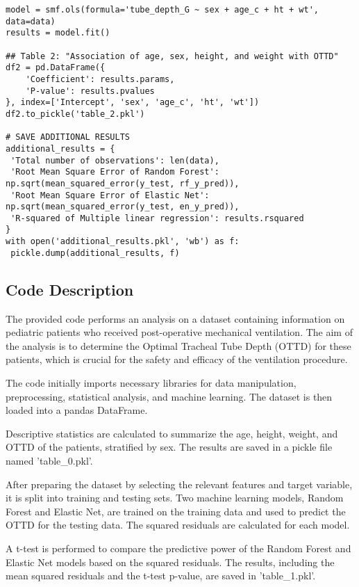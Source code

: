 \documentclass[11pt]{article}
\begin{document}
\begin{verbatim}
model = smf.ols(formula='tube_depth_G ~ sex + age_c + ht + wt', data=data)
results = model.fit()

## Table 2: "Association of age, sex, height, and weight with OTTD"
df2 = pd.DataFrame({
    'Coefficient': results.params,
    'P-value': results.pvalues
}, index=['Intercept', 'sex', 'age_c', 'ht', 'wt'])
df2.to_pickle('table_2.pkl')

# SAVE ADDITIONAL RESULTS
additional_results = {
 'Total number of observations': len(data),
 'Root Mean Square Error of Random Forest': np.sqrt(mean_squared_error(y_test, rf_y_pred)),
 'Root Mean Square Error of Elastic Net': np.sqrt(mean_squared_error(y_test, en_y_pred)),
 'R-squared of Multiple linear regression': results.rsquared
}
with open('additional_results.pkl', 'wb') as f:
 pickle.dump(additional_results, f)

\end{verbatim}

\subsection{Code Description}

The provided code performs an analysis on a dataset containing information on pediatric patients who received post-operative mechanical ventilation. The aim of the analysis is to determine the Optimal Tracheal Tube Depth (OTTD) for these patients, which is crucial for the safety and efficacy of the ventilation procedure.

The code initially imports necessary libraries for data manipulation, preprocessing, statistical analysis, and machine learning. The dataset is then loaded into a pandas DataFrame.

Descriptive statistics are calculated to summarize the age, height, weight, and OTTD of the patients, stratified by sex. The results are saved in a pickle file named 'table\_0.pkl'.

After preparing the dataset by selecting the relevant features and target variable, it is split into training and testing sets. Two machine learning models, Random Forest and Elastic Net, are trained on the training data and used to predict the OTTD for the testing data. The squared residuals are calculated for each model.

A t-test is performed to compare the predictive power of the Random Forest and Elastic Net models based on the squared residuals. The results, including the mean squared residuals and the t-test p-value, are saved in 'table\_1.pkl'.
\end{document}
